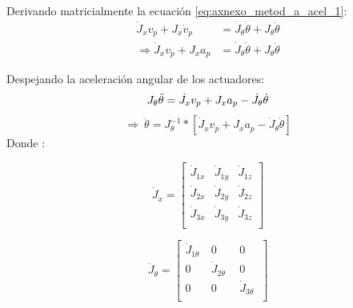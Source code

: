             Derivando matricialmente la ecuación \ref{eq:axnexo_metod_a_acel_1}:
            \begin{align*}
                 \dot{J}_{x}v_{p}+J_{x}\dot{v}_{p}&=\dot{J}_{ \theta }\dot{ \theta }+J_{ \theta }\ddot{ \theta }\\
                 \Longrightarrow \dot{J}_{x}v_{p}+J_{x}a_{p}&=\dot{J}_{ \theta }\dot{ \theta }+J_{ \theta }\ddot{ \theta }
            \end{align*}
            
            Despejando la aceleración angular de los actuadores:
            \begin{equation*}
             J_{ \theta }\ddot{ \theta }=\dot{J}_{x}v_{p}+J_{x}a_{p}-\dot{J}_{ \theta }\dot{ \theta } \\
            \end{equation*}
            \begin{equation}
             \Longrightarrow~\ddot{ \theta }=J_{ \theta }^{-1}\ast \left[ \dot{J}_{x}v_{p}+J_{x}a_{p}-\dot{J}_{ \theta }\dot{ \theta } \right]       
             \label{eq:finalanexoacelmeta}
            \end{equation}
            Donde :

  \begin{equation*}
            \dot{J}_{x}= \left[ \begin{matrix}
            \dot{J}_{1x}  &  \dot{J}_{1y}  &  \dot{J}_{1z}\\
            \dot{J}_{2x}  &  \dot{J}_{2y}  &  \dot{J}_{2z}\\
            \dot{J}_{3x}  &  \dot{J}_{3y}  &  \dot{J}_{3z}\\
            \end{matrix}
             \right]
  \end{equation*}
  
  \begin{equation*}
\dot{J}_{ \theta }= \left[ \begin{matrix}
            \dot{J}_{1 \theta }~  &  0  &  0\\
            0  &  \dot{J}_{2 \theta }~~  &  0\\
            0  &  0  &  \dot{J}_{3 \theta }~\\
            \end{matrix}
             \right] 
     \end{equation*}
         
